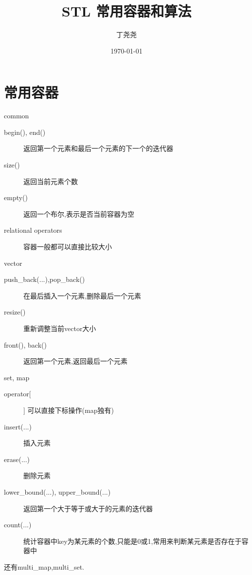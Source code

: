 \documentclass[11pt,serif]{beamer}
\begin{document}
	\author{丁尧尧}
	\title{STL 常用容器和算法}
	\date{\today}
	
	\begin{frame}[plain]
	\maketitle
	\end{frame}

	\begin{frame}
		\tableofcontents
	\end{frame}

	\section{常用容器}
	\begin{frame}{common} 
		\begin{description}
			\item [begin(), end()] 返回第一个元素和最后一个元素的下一个的迭代器
			\item [size()] 返回当前元素个数
			\item [empty()] 返回一个布尔,表示是否当前容器为空
			\item [relational operators] 容器一般都可以直接比较大小
		\end{description}
	\end{frame} 
	\begin{frame}{vector}
		\begin{description}
			\item [push\_back(...),pop\_back()] 在最后插入一个元素,删除最后一个元素
			\item [resize()] 重新调整当前vector大小
			\item [front(), back()] 返回第一个元素,返回最后一个元素
		\end{description}
	\end{frame}
	\begin{frame}{set, map}
		\begin{description}
			\item[operator[]] 可以直接下标操作(map独有)
			\item[insert(...)]  插入元素
			\item[erase(...)] 删除元素
			\item[lower\_bound(...), upper\_bound(...)] 返回第一个大于等于或大于的元素的迭代器
			\item[count(...)] 统计容器中key为某元素的个数,只能是0或1,常用来判断某元素是否存在于容器中
		\end{description}
	
		还有multi\_map,multi\_set.
	\end{frame}
\end{document}
